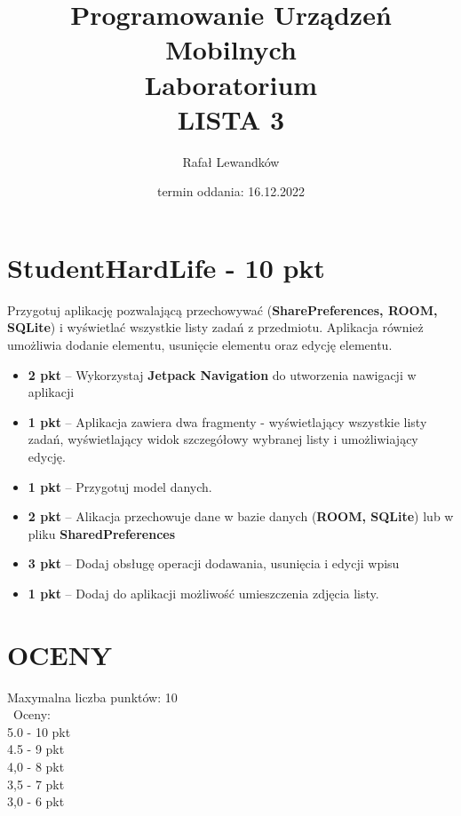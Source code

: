 \documentclass[a4paper]{article}
\title{Programowanie Urządzeń Mobilnych \\ Laboratorium \\ \textbf{LISTA 3}}
\author{Rafał Lewandków}
\date{termin oddania: 16.12.2022}
\begin{document}
\maketitle
    

\section*{StudentHardLife - 10 pkt}

Przygotuj aplikację pozwalającą przechowywać (\textbf{SharePreferences, ROOM, SQLite}) i wyświetlać wszystkie listy zadań z przedmiotu. Aplikacja również umożliwia dodanie elementu, usunięcie elementu oraz edycję elementu. 

\begin{itemize}
\item \textbf{2 pkt} -- Wykorzystaj \textbf{Jetpack Navigation} do utworzenia nawigacji w aplikacji

\item \textbf{1 pkt} -- Aplikacja zawiera dwa fragmenty - wyświetlający wszystkie listy zadań, wyświetlający widok szczegółowy wybranej listy i umożliwiający edycję.

\item \textbf{1 pkt} -- Przygotuj model danych.

\item \textbf{2 pkt} -- Alikacja przechowuje dane w bazie danych (\textbf{ROOM, SQLite}) lub w pliku \textbf{SharedPreferences}

\item \textbf{3 pkt} -- Dodaj obsługę operacji dodawania, usunięcia i edycji wpisu

\item \textbf{1 pkt} -- Dodaj do aplikacji możliwość umieszczenia zdjęcia listy.
\end{itemize}

\section*{OCENY}
Maxymalna liczba punktów: 10\\\
Oceny:\\
5.0 - 10 pkt\\
4.5 - 9 pkt\\
4,0 - 8 pkt\\
3,5 - 7 pkt\\
3,0 - 6 pkt
\end{document}

